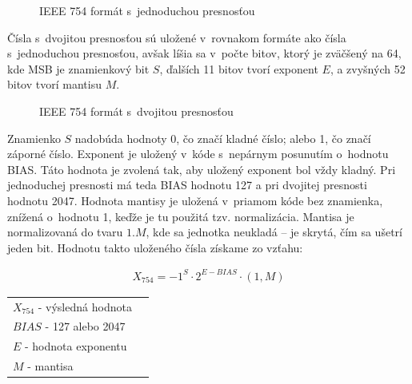 \bigskip
\begin{figure}[h]
\centering
{}
\caption{IEEE 754 formát s~jednoduchou presnosťou}
\label{formatFP32}
\end{figure}


Čísla s~dvojitou presnosťou sú uložené v~rovnakom formáte ako čísla s~jednoduchou presnosťou, avšak líšia sa v~počte bitov, ktorý je zväčšený na 64, kde MSB je znamienkový bit $ S $, ďalších 11 bitov tvorí exponent $ E $, a zvyšných 52 bitov tvorí mantisu $ M $.

\bigskip
\begin{figure}[h]
\centering
{}
\caption{IEEE 754 formát s~dvojitou presnosťou}
\label{formatFP64}
\end{figure}

Znamienko $ S $ nadobúda hodnoty 0, čo značí kladné číslo; alebo 1, čo značí záporné číslo. Exponent je uložený v~kóde s~nepárnym posunutím o~hodnotu BIAS. Táto hodnota je zvolená tak, aby uložený exponent bol vždy kladný. Pri jednoduchej presnosti má teda BIAS hodnotu 127 a pri dvojitej presnosti hodnotu 2047.
\newpage
Hodnota mantisy je uložená v~priamom kóde bez znamienka, znížená o~hodnotu 1, keďže je tu použitá tzv. normalizácia. Mantisa je normalizovaná do tvaru $ 1.M $, kde sa jednotka neukladá -- je skrytá, čím sa ušetrí jeden bit. Hodnotu takto uloženého čísla získame zo vzťahu:

\begin{eqnarray}
X_{754} = -1^{S}\cdot 2^{E-BIAS}\cdot (1,M)
\end{eqnarray}

\begin{tabular}{ll}
$ X_{754} $ - výsledná hodnota \\
$ BIAS $ - 127 alebo 2047 \\
$ E $ - hodnota exponentu \\
$ M $ - mantisa \\
\end{tabular}
\bigskip

